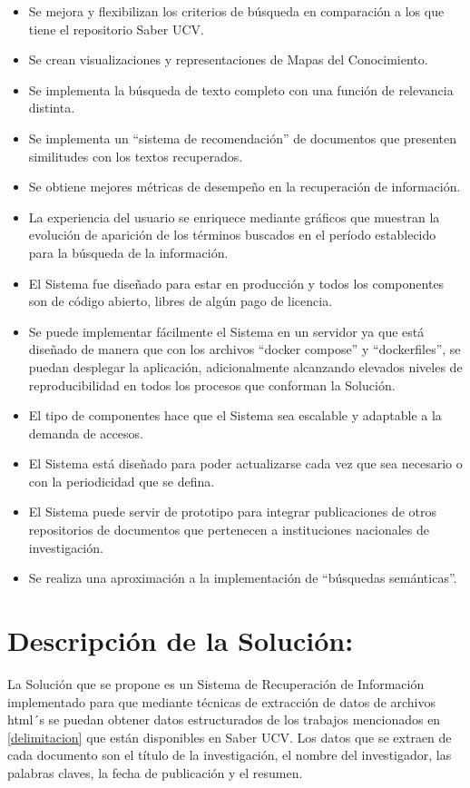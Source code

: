 \documentclass[
  10,
  openany]{book}
\begin{document}
\begin{itemize}
\item
  Se mejora y flexibilizan los criterios de búsqueda en comparación a los que tiene el repositorio Saber UCV.
\item
  Se crean visualizaciones y representaciones de Mapas del Conocimiento.
\item
  Se implementa la búsqueda de texto completo con una función de relevancia distinta.
\item
  Se implementa un ``sistema de recomendación'' de documentos que presenten similitudes con los textos recuperados.
\item
  Se obtiene mejores métricas de desempeño en la recuperación de información.
\item
  La experiencia del usuario se enriquece mediante gráficos que muestran la evolución de aparición de los términos buscados en el período establecido para la búsqueda de la información.
\item
  El Sistema fue diseñado para estar en producción y todos los componentes son de código abierto, libres de algún pago de licencia.
\item
  Se puede implementar fácilmente el Sistema en un servidor ya que está diseñado de manera que con los archivos ``docker compose'' y ``dockerfiles'', se puedan desplegar la aplicación, adicionalmente alcanzando elevados niveles de reproducibilidad en todos los procesos que conforman la Solución.
\item
  El tipo de componentes hace que el Sistema sea escalable y adaptable a la demanda de accesos.
\item
  El Sistema está diseñado para poder actualizarse cada vez que sea necesario o con la periodicidad que se defina.
\item
  El Sistema puede servir de prototipo para integrar publicaciones de otros repositorios de documentos que pertenecen a instituciones nacionales de investigación.
\item
  Se realiza una aproximación a la implementación de ``búsquedas semánticas''.
\end{itemize}

\hypertarget{descripcion}{%
\section{Descripción de la Solución:}\label{descripcion}}

La Solución que se propone es un Sistema de Recuperación de Información implementado para que mediante técnicas de extracción de datos de archivos html´s se puedan obtener datos estructurados de los trabajos mencionados en \ref{delimitacion} que están disponibles en Saber UCV. Los datos que se extraen de cada documento son el título de la investigación, el nombre del investigador, las palabras claves, la fecha de publicación y el resumen.
\end{document}
